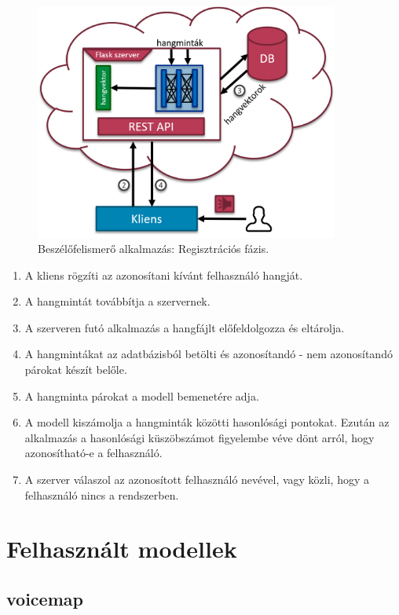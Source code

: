 \begin{figure}[!ht]
	\centering
	\includegraphics[width=100mm, keepaspectratio]{figures/app-identify.png}
	\caption{Beszélőfelismerő alkalmazás: Regisztrációs fázis.}
	\label{fig:app-identify}
\end{figure}

\begin{enumerate}
	\item A kliens rögzíti az azonosítani kívánt felhasználó hangját.
	\item A hangmintát továbbítja a szervernek.
	\item A szerveren futó alkalmazás a hangfájlt előfeldolgozza és eltárolja.
	\item A hangmintákat az adatbázisból betölti és azonosítandó - nem azonosítandó párokat készít belőle.
	\item A hangminta párokat a modell bemenetére adja.
	\item A modell kiszámolja a hangminták közötti hasonlósági pontokat. Ezután az alkalmazás a hasonlósági küszöbszámot figyelembe véve dönt arról, hogy azonosítható-e a felhasználó.
	\item A szerver válaszol az azonosított felhasználó nevével, vagy közli, hogy a felhasználó nincs a rendszerben.
\end{enumerate}

\section{Felhasznált modellek}

\subsection{voicemap}

